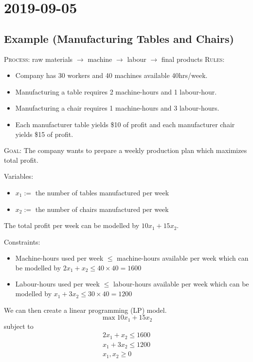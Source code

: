 \section{2019-09-05}
\subsection{Example (Manufacturing Tables and Chairs)}
\textsc{Process}: raw materials $\rightarrow$ machine $\rightarrow$ labour $\rightarrow$ final products
\textsc{Rules}:
\begin{itemize}
    \item Company has 30 workers and 40 machines available 40hrs/week.
    \item Manufacturing a table requires 2 machine-hours and 1 labour-hour.
    \item Manufacturing a chair requires 1 machine-hours and 3 labour-hours.
    \item Each manufacturer table yields \$10 of profit and each manufacturer chair yields \$15 of profit.
\end{itemize}

\textsc{Goal}: The company wants to prepare a weekly production plan which maximizes
total profit.

Variables:
\begin{itemize}
    \item $x_1:=$ the number of tables manufactured per week
    \item $x_2:=$ the number of chairs manufactured per week
\end{itemize}

The total profit per week can be modelled by $10x_1 + 15x_2$.

Constraints:
\begin{itemize}
    \item Machine-hours used per week $\le$  machine-hours available per week which
can be modelled by $2x_1 + x_2 \le  40 \times 40 = 1600$
    \item Labour-hours used per week $\le$ labour-hours available per week which can
    be modelled by $x_1 + 3x_2 \le 30 \times 40 = 1200$
\end{itemize}

We can then create a linear programming (LP) model.
\[\max 10x_1 + 15x_2\]
subject to
\begin{align*}
    2x_1 + x_2 \le 1600\\
    x_1 + 3x_2 \le 1200\\
    x_1, x_2 \ge 0
\end{align*}

